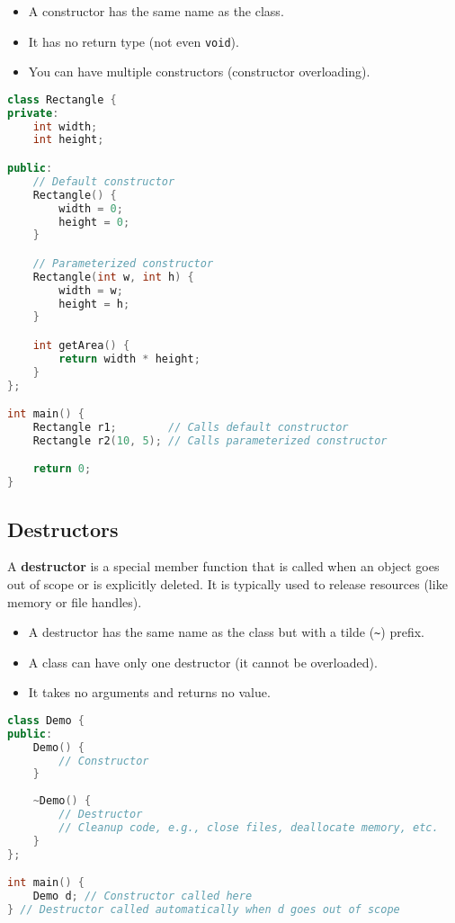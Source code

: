 \documentclass[a4paper,12pt]{article}
\begin{document}
\begin{itemize}
    \item A constructor has the same name as the class.
    \item It has no return type (not even \texttt{void}).
    \item You can have multiple constructors (constructor overloading).
\end{itemize}

\begin{lstlisting}[language=C++]
class Rectangle {
private:
    int width;
    int height;

public:
    // Default constructor
    Rectangle() {
        width = 0;
        height = 0;
    }

    // Parameterized constructor
    Rectangle(int w, int h) {
        width = w;
        height = h;
    }

    int getArea() {
        return width * height;
    }
};

int main() {
    Rectangle r1;        // Calls default constructor
    Rectangle r2(10, 5); // Calls parameterized constructor

    return 0;
}
\end{lstlisting}

\subsection{Destructors}
A \textbf{destructor} is a special member function that is called when an object goes out of scope or is explicitly deleted. It is typically used to release resources (like memory or file handles).

\begin{itemize}
    \item A destructor has the same name as the class but with a tilde (\texttt{\~{}}) prefix.
    \item A class can have only one destructor (it cannot be overloaded).
    \item It takes no arguments and returns no value.
\end{itemize}

\begin{lstlisting}[language=C++]
class Demo {
public:
    Demo() {
        // Constructor
    }
    
    ~Demo() {
        // Destructor
        // Cleanup code, e.g., close files, deallocate memory, etc.
    }
};

int main() {
    Demo d; // Constructor called here
} // Destructor called automatically when d goes out of scope
\end{lstlisting}
\end{document}
